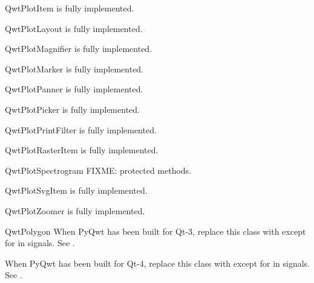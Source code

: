 \documentclass{manual}
\begin{document}
\begin{classdesc*}{QwtPlotItem}
  is fully implemented.
\end{classdesc*}

\begin{classdesc*}{QwtPlotLayout}
  is fully implemented.
\end{classdesc*}

\begin{classdesc*}{QwtPlotMagnifier}
  is fully implemented.
\end{classdesc*}

\begin{classdesc*}{QwtPlotMarker}
  is fully implemented.
\end{classdesc*}

\begin{classdesc*}{QwtPlotPanner}
  is fully implemented.
\end{classdesc*}

\begin{classdesc*}{QwtPlotPicker}
  is fully implemented.
\end{classdesc*}

\begin{classdesc*}{QwtPlotPrintFilter}
  is fully implemented.
\end{classdesc*}

\begin{classdesc*}{QwtPlotRasterItem}
  is fully implemented.
\end{classdesc*}

\begin{classdesc*}{QwtPlotSpectrogram}
  FIXME: protected methods.
\end{classdesc*}

\begin{classdesc*}{QwtPlotSvgItem}
  is fully implemented.
\end{classdesc*}

\begin{classdesc*}{QwtPlotZoomer}
  is fully implemented.
\end{classdesc*}

\begin{classdesc*}{QwtPolygon}
  When PyQwt has been built for Qt-3, replace this class with
   except for in signals. See .

  When PyQwt has been built for Qt-4, replace this class with 
  except for in signals. See .
\end{classdesc*}
\end{document}
